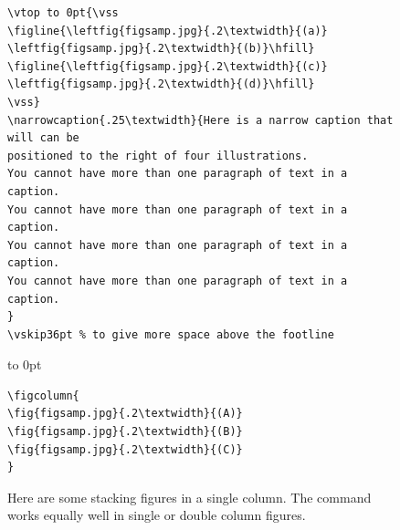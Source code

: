 \documentclass[reprint]{JASA}
\begin{document}
\begin{figure}
\baselineskip=12pt
\begin{verbatim}
\vtop to 0pt{\vss
\figline{\leftfig{figsamp.jpg}{.2\textwidth}{(a)}
\leftfig{figsamp.jpg}{.2\textwidth}{(b)}\hfill}
\figline{\leftfig{figsamp.jpg}{.2\textwidth}{(c)}
\leftfig{figsamp.jpg}{.2\textwidth}{(d)}\hfill}
\vss}
\narrowcaption{.25\textwidth}{Here is a narrow caption that will can be
positioned to the right of four illustrations.
You cannot have more than one paragraph of text in a caption.
You cannot have more than one paragraph of text in a caption.
You cannot have more than one paragraph of text in a caption.
You cannot have more than one paragraph of text in a caption.
}
\vskip36pt % to give more space above the footline
\end{verbatim}
\vskip1.3in
\vtop to 0pt{\vss
{}
\vss}
\vskip36pt
\end{figure}
\clearpage

\begin{figure}[h]
\baselineskip=12pt
\begin{verbatim}
\figcolumn{
\fig{figsamp.jpg}{.2\textwidth}{(A)}
\fig{figsamp.jpg}{.2\textwidth}{(B)}
\fig{figsamp.jpg}{.2\textwidth}{(C)}
}
\end{verbatim}


\caption{Here are some stacking figures in a single column. 
The {\tt\string\figcolumn\string{\string}} command works equally well in single
or double column figures.}
\end{figure}
\end{document}
